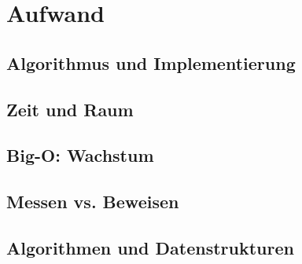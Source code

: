 \chapter{Aufwand}
\section{Algorithmus und Implementierung}
\section{Zeit und Raum}
\section{Big-O: Wachstum}
\section{Messen vs. Beweisen}
\section{Algorithmen und Datenstrukturen}
